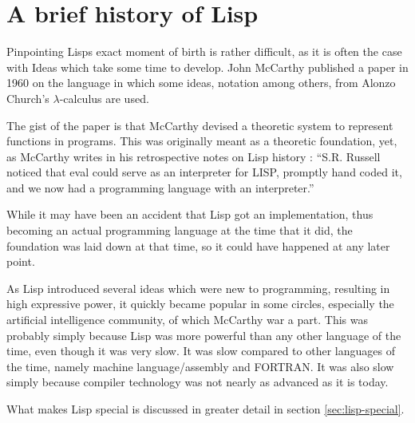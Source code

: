\documentclass[a4paper,10pt,twoside]{report}
\begin{document}
\chapter{A brief history of Lisp}
\label{sec:lisp-hist}

Pinpointing Lisps exact moment of birth is rather difficult, as it is often the
case with Ideas which take some time to develop.  John McCarthy published a
paper in 1960 on the language\cite{rec-fun-sym-expr} in which some ideas,
notation among others, from Alonzo Church’s $\lambda$-calculus are used.

The gist of the paper is that McCarthy devised a theoretic system to represent
functions in programs.  This was originally meant as a theoretic foundation,
yet, as McCarthy writes in his retrospective notes on Lisp history
\cite{lisp-hist}: “S.R. Russell noticed that eval could serve as an interpreter
for LISP, promptly hand coded it, and we now had a programming language with an
interpreter.”

While it may have been an accident that Lisp got an implementation, thus
becoming an actual programming language at the time that it did, the foundation
was laid down at that time, so it could have happened at any later point.

As Lisp introduced several ideas which were new to programming, resulting in
high expressive power, it quickly became popular in some circles, especially the
artificial intelligence community, of which McCarthy war a part.  This was
probably simply because Lisp was more powerful than any other language of the
time, even though it was very slow.  It was slow compared to other languages of
the time, namely machine language/assembly and FORTRAN.  It was also slow simply
because compiler technology was not nearly as advanced as it is today.

What makes Lisp special is discussed in greater detail in section
\ref{sec:lisp-special}. 
\end{document}

